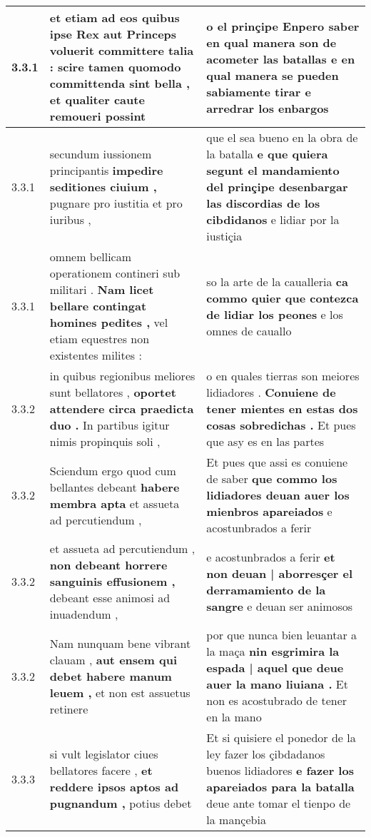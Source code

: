 \begin{tabular}{|p{1cm}|p{6.5cm}|p{6.5cm}|}
3.3.1 & et etiam ad eos quibus ipse Rex aut Princeps voluerit committere talia : \textbf{ scire tamen quomodo committenda sint bella , } et qualiter caute remoueri possint & o el prinçipe \textbf{ Enpero saber en qual manera son de acometer las batallas } e en qual manera se pueden sabiamente tirar e arredrar los enbargos \\\hline
3.3.1 & secundum iussionem principantis \textbf{ impedire seditiones ciuium , } pugnare pro iustitia et pro iuribus , & que el sea bueno en la obra de la batalla \textbf{ e que quiera segunt el mandamiento del prinçipe desenbargar las discordias de los cibdidanos } e lidiar por la iustiçia \\\hline
3.3.1 & omnem bellicam operationem contineri sub militari . \textbf{ Nam licet bellare contingat homines pedites , } vel etiam equestres non existentes milites : & so la arte de la caualleria \textbf{ ca commo quier que contezca de lidiar los peones } e los omnes de cauallo \\\hline
3.3.2 & in quibus regionibus meliores sunt bellatores , \textbf{ oportet attendere circa praedicta duo . } In partibus igitur nimis propinquis soli , & o en quales tierras son meiores lidiadores . \textbf{ Conuiene de tener mientes en estas dos cosas sobredichas . } Et pues que asy es en las partes \\\hline
3.3.2 & Sciendum ergo quod cum bellantes debeant \textbf{ habere membra apta } et assueta ad percutiendum , & Et pues que assi es conuiene de saber \textbf{ que commo los lidiadores deuan auer los mienbros apareiados } e acostunbrados a ferir \\\hline
3.3.2 & et assueta ad percutiendum , \textbf{ non debeant horrere sanguinis effusionem , } debeant esse animosi ad inuadendum , & e acostunbrados a ferir \textbf{ et non deuan | aborresçer el derramamiento de la sangre } e deuan ser animosos \\\hline
3.3.2 & Nam nunquam bene vibrant clauam , \textbf{ aut ensem qui debet habere manum leuem , } et non est assuetus retinere & por que nunca bien leuantar a la maça \textbf{ nin esgrimira la espada | aquel que deue auer la mano liuiana . } Et non es acostubrado de tener en la mano \\\hline
3.3.3 & si vult legislator ciues bellatores facere , \textbf{ et reddere ipsos aptos ad pugnandum , } potius debet & Et si quisiere el ponedor de la ley fazer los çibdadanos buenos lidiadores \textbf{ e fazer los apareiados para la batalla } deue ante tomar el tienpo de la mançebia \\\hline

\end{tabular}
